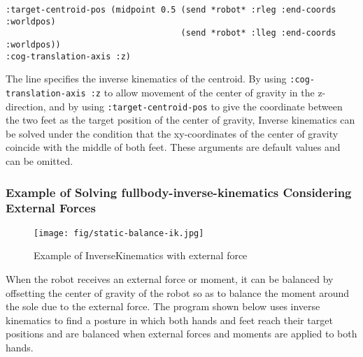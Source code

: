 {\baselineskip=10pt
\begin{verbatim}
:target-centroid-pos (midpoint 0.5 (send *robot* :rleg :end-coords :worldpos)
                                   (send *robot* :lleg :end-coords :worldpos))
:cog-translation-axis :z)
\end{verbatim}
}
The line specifies the inverse kinematics of the centroid. By using \verb|:cog-translation-axis :z| to allow movement of the center of gravity in the z-direction, and by using \verb|:target-centroid-pos| to give the coordinate between the two feet as the target position of the center of gravity, Inverse kinematics can be solved under the condition that the xy-coordinates of the center of gravity coincide with the middle of both feet. These arguments are default values and can be omitted.

\subsubsection{Example of Solving fullbody-inverse-kinematics Considering External Forces}
\begin{figure}[htb]
  \begin{center}
    \texttt{[image: fig/static-balance-ik.jpg]}
    \caption{Example of InverseKinematics with external force}
  \end{center}
\end{figure}
When the robot receives an external force or moment, it can be balanced by offsetting the center of gravity of the robot so as to balance the moment around the sole due to the external force.
The program shown below uses inverse kinematics to find a posture in which both hands and feet reach their target positions and are balanced when external forces and moments are applied to both hands.


